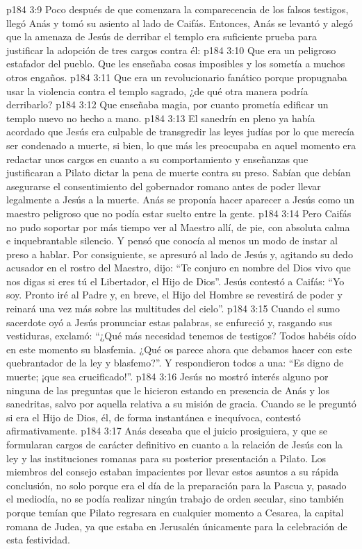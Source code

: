 \vs p184 3:9 Poco después de que comenzara la comparecencia de los falsos testigos, llegó Anás y tomó su asiento al lado de Caifás. Entonces, Anás se levantó y alegó que la amenaza de Jesús de derribar el templo era suficiente prueba para justificar la adopción de tres cargos contra él:
\vs p184 3:10 Que era un peligroso estafador del pueblo. Que les enseñaba cosas imposibles y los sometía a muchos otros engaños.
\vs p184 3:11 Que era un revolucionario fanático porque propugnaba usar la violencia contra el templo sagrado, ¿de qué otra manera podría derribarlo?
\vs p184 3:12 Que enseñaba magia, por cuanto prometía edificar un templo nuevo no hecho a mano.
\vs p184 3:13 \pc El sanedrín en pleno ya había acordado que Jesús era culpable de transgredir las leyes judías por lo que merecía ser condenado a muerte, si bien, lo que más les preocupaba en aquel momento era redactar unos cargos en cuanto a su comportamiento y enseñanzas que justificaran a Pilato dictar la pena de muerte contra su preso. Sabían que debían asegurarse el consentimiento del gobernador romano antes de poder llevar legalmente a Jesús a la muerte. Anás se proponía hacer aparecer a Jesús como un maestro peligroso que no podía estar suelto entre la gente.
\vs p184 3:14 Pero Caifás no pudo soportar por más tiempo ver al Maestro allí, de pie, con absoluta calma e inquebrantable silencio. Y pensó que conocía al menos un modo de instar al preso a hablar. Por consiguiente, se apresuró al lado de Jesús y, agitando su dedo acusador en el rostro del Maestro, dijo: “Te conjuro en nombre del Dios vivo que nos digas si eres tú el Libertador, el Hijo de Dios”. Jesús contestó a Caifás: “Yo soy. Pronto iré al Padre y, en breve, el Hijo del Hombre se revestirá de poder y reinará una vez más sobre las multitudes del cielo”.
\vs p184 3:15 Cuando el sumo sacerdote oyó a Jesús pronunciar estas palabras, se enfureció y, rasgando sus vestiduras, exclamó: “¿Qué más necesidad tenemos de testigos? Todos habéis oído en este momento su blasfemia. ¿Qué os parece ahora que debamos hacer con este quebrantador de la ley y blasfemo?”. Y respondieron todos a una: “Es digno de muerte; ¡que sea crucificado!”.
\vs p184 3:16 Jesús no mostró interés alguno por ninguna de las preguntas que le hicieron estando en presencia de Anás y los sanedritas, salvo por aquella relativa a su misión de gracia. Cuando se le preguntó si era el Hijo de Dios, él, de forma instantánea e inequívoca, contestó afirmativamente.
\vs p184 3:17 Anás deseaba que el juicio prosiguiera, y que se formularan cargos de carácter definitivo en cuanto a la relación de Jesús con la ley y las instituciones romanas para su posterior presentación a Pilato. Los miembros del consejo estaban impacientes por llevar estos asuntos a su rápida conclusión, no solo porque era el día de la preparación para la Pascua y, pasado el mediodía, no se podía realizar ningún trabajo de orden secular, sino también porque temían que Pilato regresara en cualquier momento a Cesarea, la capital romana de Judea, ya que estaba en Jerusalén únicamente para la celebración de esta festividad.
